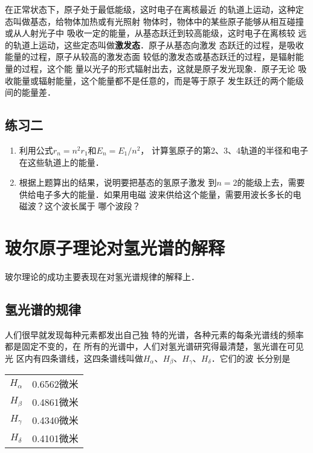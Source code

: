 在正常状态下，原子处于最低能级，这时电子在离核最近
的轨道上运动，这种定态叫做基态，给物体加热或有光照射
物体时，物体中的某些原子能够从相互碰撞或从人射光子中
吸收一定的能量，从基态跃迁到较高能级，这时电子在离核较
远的轨道上运动，这些定态叫做\textbf{激发态}．原子从基态向激发
态跃迁的过程，是吸收能量的过程，原子从较高的激发态面
较低的激发态或基态跃迁的过程，是辐射能量的过程，这个能
量以光子的形式辐射出去，这就是原子发光现象．原子无论
吸收能量或辐射能量，这个能量都不是任意的，而是等于原子
发生跃迁的两个能级间的能量差．


\subsection*{练习二}

\begin{enumerate}
    \item 利用公式$r_n=n^2r_1$和$E_n=E_1/n^2$，
计算氢原子的第2、3、4轨道的半径和电子在这些轨道上的能量．
\item 根据上题算出的结果，说明要把基态的氢原子激发
到$n=2$的能级上去，需要供给电子多大的能量．如果用电磁
波来供给这个能量，需要用波长多长的电磁波？这个波长属于
哪个波段？
\end{enumerate}

\section{玻尔原子理论对氢光谱的解释}

玻尔理论的成功主要表现在对氢光谱规律的解释上．

\subsection{氢光谱的规律}

人们很早就发现每种元素都发出自己独
特的光谱，各种元素的每条光谱线的频率都是固定不变的，在
所有的光谱中，人们对氢光谱研究得最清楚，氢光谱在可见光
区内有四条谱线，这四条谱线叫做$H_{\alpha}$、$H_{\beta}$、$H_{\gamma}$、$H_{\delta}$．它们的波
长分别是
\begin{center}
    \begin{tabular}{cc}
        $H_{\alpha}$  &0.6562微米\\
        $H_{\beta}$  &0.4861微米\\
        $H_{\gamma}$  &0.4340微米\\
        $H_{\delta}$  &0.4101微米\\
    \end{tabular}
\end{center}

